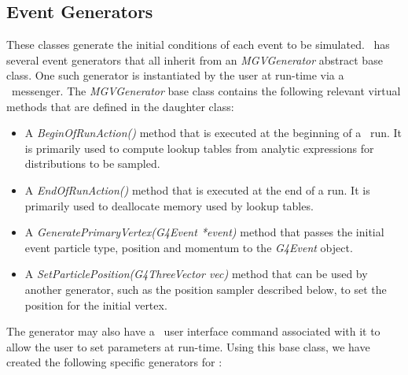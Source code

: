 \documentclass[article]{IEEEtran}
\begin{document}
\subsection{Event Generators}
\label{se:event_generators}
These classes generate the initial conditions of each event to be simulated. \MaGe\ has several event generators that all inherit from an \emph{MGVGenerator} abstract base class. One such generator is instantiated by the user at run-time via a \GF\ messenger. The \emph{MGVGenerator} base class contains the following relevant virtual methods that are defined in the daughter class:
\begin{itemize}
\item A \emph{BeginOfRunAction()} method that is executed at the beginning of a \GF\ run. It is primarily used to compute lookup tables from analytic expressions for distributions to be sampled.
\item A \emph{EndOfRunAction()} method that is executed at the end of a run. It is primarily used to deallocate memory used by lookup tables. 
\item A \emph{GeneratePrimaryVertex(G4Event *event)} method that passes the initial event particle type, position and 
momentum to the \emph{G4Event} object. 
\item A \emph{SetParticlePosition(G4ThreeVector vec)} method that can be used by another generator, such as the position sampler described below, to set the position for the initial vertex. 
\end{itemize} 
The generator may also have a \GF\ user interface command associated with it to allow the user to set parameters at run-time. Using this base class, we have created the following specific generators for \MaGe:
\end{document}
